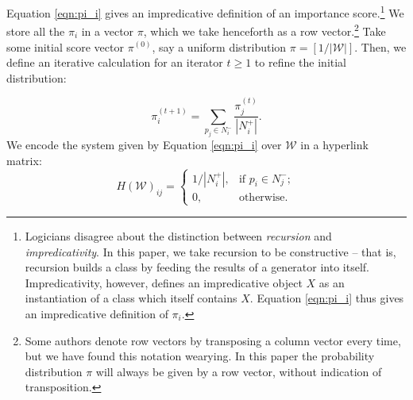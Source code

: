 \documentclass[12pt]{article}
\newcommand{\iterate}[2]{#1^{(#2)}}
\begin{document}
Equation \eqref{eqn:pi_i} gives an impredicative definition of an importance
score.\footnote{Logicians disagree about the distinction between
  \textit{recursion} and \textit{impredicativity}. In this paper, we take
  recursion to be constructive -- that is, recursion builds a class by feeding
  the results of a generator into itself. Impredicativity, however, defines an
  impredicative object $X$ as an instantiation of a class which itself contains
  $X$. Equation \eqref{eqn:pi_i} thus gives an impredicative definition of
  $\pi_i$.} We store all the $\pi_i$ in a vector $\pi$, which we take henceforth
as a row vector.\footnote{Some authors denote row vectors by transposing a
  column vector every time, but we have found this notation wearying. In this
  paper the probability distribution $\pi$ will always be given by a row vector,
  without indication of transposition.} Take some initial score vector
$\iterate{\pi}{0}$, say a uniform distribution $\pi = [1/|\mathcal{W}|]$. Then,
we define an iterative calculation for an iterator $t\geq 1$ to refine the
initial distribution:

\begin{equation}
  \label{eqn:pi_t}
  \iterate{\pi}{t+1}_i = \sum_{p_j\in N^-_i}{\frac{\iterate{\pi}{t}_j}{|N^+_i|}}.
\end{equation}
We encode the system given by Equation \eqref{eqn:pi_i} over $\mathcal{W}$ in a hyperlink matrix:
\begin{equation*}
  H(\mathcal{W})_{ij}=\begin{cases}
    1/|N^+_i|, & \text{if } p_i \in N^-_j; \\
    0, & \text{otherwise}.
  \end{cases}
\end{equation*}
\end{document}
